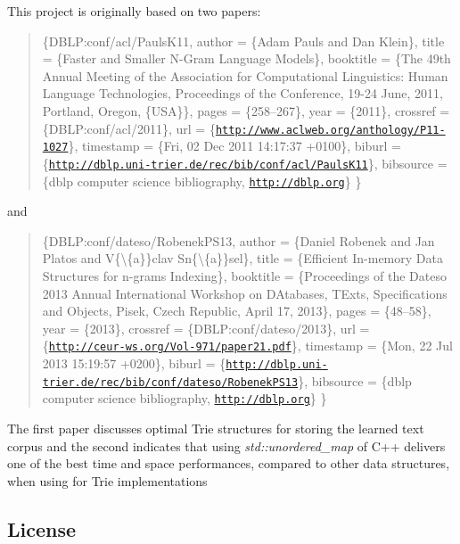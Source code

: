 This project is originally based on two papers\+: \begin{quote}
\{D\+B\+L\+P\+:conf/acl/\+Pauls\+K11, author = \{Adam Pauls and Dan Klein\}, title = \{Faster and Smaller N-\/\+Gram Language Models\}, booktitle = \{The 49th Annual Meeting of the Association for Computational Linguistics\+: Human Language Technologies, Proceedings of the Conference, 19-\/24 June, 2011, Portland, Oregon, \{U\+S\+A\}\}, pages = \{258--267\}, year = \{2011\}, crossref = \{D\+B\+L\+P\+:conf/acl/2011\}, url = \{\href{http://www.aclweb.org/anthology/P11-1027}{\tt http\+://www.\+aclweb.\+org/anthology/\+P11-\/1027}\}, timestamp = \{Fri, 02 Dec 2011 14\+:17\+:37 +0100\}, biburl = \{\href{http://dblp.uni-trier.de/rec/bib/conf/acl/PaulsK11}{\tt http\+://dblp.\+uni-\/trier.\+de/rec/bib/conf/acl/\+Pauls\+K11}\}, bibsource = \{dblp computer science bibliography, \href{http://dblp.org}{\tt http\+://dblp.\+org}\} \} \end{quote}


and

\begin{quote}
\{D\+B\+L\+P\+:conf/dateso/\+Robenek\+P\+S13, author = \{Daniel Robenek and Jan Platos and V\{\textbackslash{}\textquotesingle{}\{a\}\}clav Sn\{\textbackslash{}\textquotesingle{}\{a\}\}sel\}, title = \{Efficient In-\/memory Data Structures for n-\/grams Indexing\}, booktitle = \{Proceedings of the Dateso 2013 Annual International Workshop on D\+Atabases, T\+Exts, Specifications and Objects, Pisek, Czech Republic, April 17, 2013\}, pages = \{48--58\}, year = \{2013\}, crossref = \{D\+B\+L\+P\+:conf/dateso/2013\}, url = \{\href{http://ceur-ws.org/Vol-971/paper21.pdf}{\tt http\+://ceur-\/ws.\+org/\+Vol-\/971/paper21.\+pdf}\}, timestamp = \{Mon, 22 Jul 2013 15\+:19\+:57 +0200\}, biburl = \{\href{http://dblp.uni-trier.de/rec/bib/conf/dateso/RobenekPS13}{\tt http\+://dblp.\+uni-\/trier.\+de/rec/bib/conf/dateso/\+Robenek\+P\+S13}\}, bibsource = \{dblp computer science bibliography, \href{http://dblp.org}{\tt http\+://dblp.\+org}\} \} \end{quote}


The first paper discusses optimal Trie structures for storing the learned text corpus and the second indicates that using {\itshape std\+::unordered\+\_\+map} of C++ delivers one of the best time and space performances, compared to other data structures, when using for Trie implementations

\subsection*{License}

